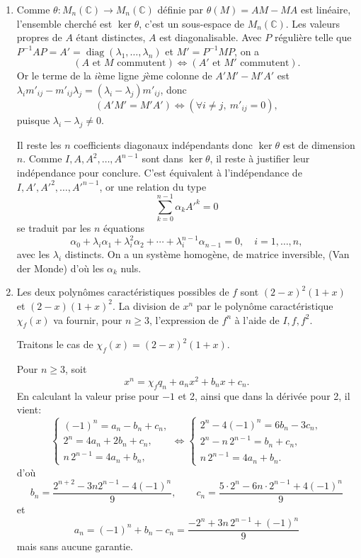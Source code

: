 \begin{enumerate}[label=\arabic*.,leftmargin=2.2em,itemsep=1.1em]
\item Comme $\theta:M_n(\mathbb C)\longrightarrow M_n(\mathbb C)$ définie par $\theta(M)=AM-MA$ est linéaire, l'ensemble cherché est $\ker\theta$, c'est un sous-espace de $M_n(\mathbb C)$. Les valeurs propres de $A$ étant distinctes, $A$ est diagonalisable. Avec $P$ régulière telle que $P^{-1}AP=A'=\operatorname{diag}(\lambda_1,\ldots,\lambda_n)$ et $M'=P^{-1}MP$, on a
\[
(A\text{ et }M\text{ commutent})\Longleftrightarrow(A'\text{ et }M'\text{ commutent}).
\]
Or le terme de la $i$ème ligne $j$ème colonne de $A'M'-M'A'$ est $\lambda_i m'_{ij}-m'_{ij}\lambda_j=(\lambda_i-\lambda_j)m'_{ij}$, donc
\[
(A'M'=M'A')\Longleftrightarrow(\forall i\ne j,\ m'_{ij}=0),
\]
puisque $\lambda_i-\lambda_j\ne0$.

Il reste les $n$ coefficients diagonaux indépendants donc $\ker\theta$ est de dimension $n$. Comme $I,A,A^2,\ldots,A^{n-1}$ sont dans $\ker\theta$, il reste à justifier leur indépendance pour conclure. C'est équivalent à l'indépendance de $I,A',A'^2,\ldots,A'^{n-1}$, or une relation du type
\[
\sum_{k=0}^{n-1}\alpha_k A'^k=0
\]
se traduit par les $n$ équations
\[
\alpha_0+\lambda_i\alpha_1+\lambda_i^2\alpha_2+\cdots+\lambda_i^{n-1}\alpha_{n-1}=0,
\quad i=1,\ldots,n,
\]
avec les $\lambda_i$ distincts. On a un système homogène, de matrice inversible, (Van der Monde) d'où les $\alpha_k$ nuls.

\item Les deux polynômes caractéristiques possibles de $f$ sont $(2-x)^2(1+x)$ et $(2-x)(1+x)^2$. La division de $x^n$ par le polynôme caractéristique $\chi_f(x)$ va fournir, pour $n\ge3$, l'expression de $f^n$ à l'aide de $I,f,f^2$.

Traitons le cas de $\chi_f(x)=(2-x)^2(1+x)$.

Pour $n\ge3$, soit
\[
x^n=\chi_f q_n+a_nx^2+b_nx+c_n.
\]
En calculant la valeur prise pour $-1$ et 2, ainsi que dans la dérivée pour 2, il vient:
\[
\begin{cases}
(-1)^n=a_n-b_n+c_n,\\
2^n=4a_n+2b_n+c_n,\\
n\,2^{n-1}=4a_n+b_n,
\end{cases}
\Longleftrightarrow
\begin{cases}
2^n-4(-1)^n=6b_n-3c_n,\\
2^n-n\,2^{n-1}=b_n+c_n,\\
n\,2^{n-1}=4a_n+b_n.
\end{cases}
\]
d'où
\[
b_n=\frac{2^{n+2}-3n2^{n-1}-4(-1)^n}{9},
\qquad
c_n=\frac{5\cdot2^n-6n\cdot2^{n-1}+4(-1)^n}{9}
\]
et
\[
a_n=(-1)^n+b_n-c_n
=\frac{-2^n+3n\,2^{n-1}+(-1)^n}{9}
\]
mais sans aucune garantie.


\end{enumerate}
